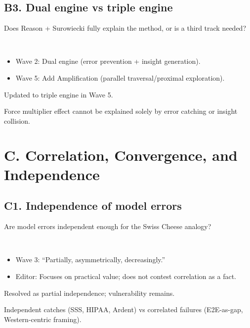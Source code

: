 \documentclass[11pt,letterpaper]{article}
\begin{document}
\subsection{B3. Dual engine vs triple engine}

\begin{reflist}
\item[Dispute:] Does Reason + Surowiecki fully explain the method, or is a third track needed?
\item[Positions:]~
  \begin{itemize}[nosep]
    \item Wave 2: Dual engine (error prevention + insight generation).
    \item Wave 5: Add Amplification (parallel traversal/proximal exploration).
  \end{itemize}
\item[Status:] Updated to triple engine in Wave 5.
\item[Evidence:] Force multiplier effect cannot be explained solely by error catching or insight collision.
\end{reflist}

\section{C. Correlation, Convergence, and Independence}

\subsection{C1. Independence of model errors}

\begin{reflist}
\item[Dispute:] Are model errors independent enough for the Swiss Cheese analogy?
\item[Positions:]~
  \begin{itemize}[nosep]
    \item Wave 3: ``Partially, asymmetrically, decreasingly.''
    \item Editor: Focuses on practical value; does not contest correlation as a fact.
  \end{itemize}
\item[Status:] Resolved as partial independence; vulnerability remains.
\item[Evidence:] Independent catches (SSS, HIPAA, Ardent) vs correlated failures (E2E-as-gap, Western-centric framing).
\end{reflist}
\end{document}

